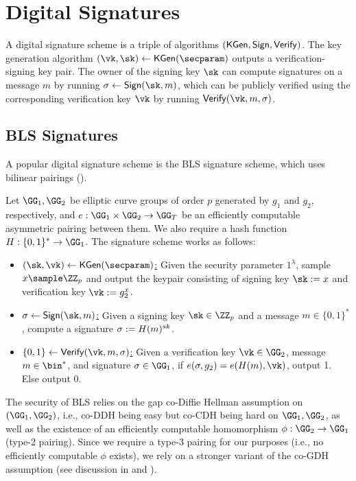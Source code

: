 \section{Digital Signatures}\label{sec:signatures}

A digital signature scheme is a triple of algorithms $({\mathsf{KGen}}, {\mathsf{Sign}}, {\mathsf{Verify}})$. The key generation algorithm $(\vk, \sk) \gets \kgen(\secparam)$ outputs a verification-signing key pair. The owner of the signing key $\sk$ can compute signatures on a message $m$ by running $\sigma \gets \sign(\sk, m)$, which can be publicly verified using the corresponding verification key $\vk$ by running $\vrfy(\vk, m, \sigma)$. 

\subsection{BLS Signatures}\label{sec:bls}

A popular digital signature scheme is the BLS signature scheme, which uses bilinear pairings ().

\begin{construction}\label{con:bls}
Let $\GG_1, \GG_2$ be elliptic curve groups of order $p$ generated by $g_1$ and $g_2$, respectively, and $e: \GG_1 \times \GG_2 \rightarrow \GG_T$ be an efficiently computable asymmetric pairing between them. We also require a hash function $\blshash: \{0, 1\}^* \rightarrow \GG_1$. The signature scheme works as follows:
\begin{itemize}
\item \underline{$(\sk, \vk) \gets \kgen(\secparam)$:} Given the security parameter $1^\lambda$, sample $x \sample \ZZ_p$ and output the keypair consisting of signing key $\sk := x$ and verification key $\vk := g_2^x$.
\item \underline{$\sigma \gets \sign(\sk, m)$:} Given a signing key $\sk \in \ZZ_p$ and a message $m \in \{0,1\}^*$, compute a signature $\sigma := H(m)^{sk}$.
\item \underline{$\{0,1\} \gets \vrfy(\vk, m, \sigma)$:} Given a verification key $\vk \in \GG_2$, message $m \in \bin^*$, and signature $\sigma \in \GG_1$, if $e(\sigma, g_2) = e(\blshash(m), \vk)$, output 1. Else output 0.
\end{itemize}
\end{construction}

The security of BLS relies on the gap co-Diffie Hellman assumption on $(\GG_1,\GG_2)$, i.e., co-DDH being easy but co-CDH being hard on $\GG_1,\GG_2$, as well as the existence of an efficiently computable homomorphism $\phi: \GG_2 \rightarrow \GG_1$ (type-2 pairing). Since we require a type-3 pairing for our purposes (i.e., no efficiently computable $\phi$ exists), we rely on a stronger variant of the co-GDH assumption (see discussion in \cite[\S3.1]{AC:BonLynSha01} and \cite[\S2.2]{EPRINT:SmaVer05}).

